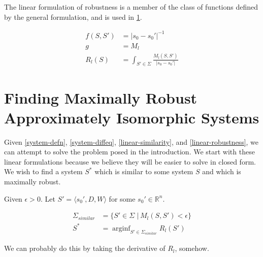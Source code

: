 \documentclass{article}
\DeclareMathOperator*{\arginf}{arginf}
\begin{document}
The linear formulation of robustness is a member of the class of functions defined by the general formulation, and is used in \ref{max-robust}.

\begin{align}
  f(S, S') &= \lvert s_0 - s_0' \rvert^{-1} \\
  g &= M_l \\
  R_l(S) &= \int_{S' \in \Sigma} \frac{M_l(S, S')}{\lvert s_0 - s_0' \rvert} \label{linear-robustness}
\end{align}

\section{Finding Maximally Robust Approximately Isomorphic Systems} \label{max-robust}
Given \eqref{system-defn}, \eqref{system-diffeq}, \eqref{linear-similarity}, and \eqref{linear-robustness}, we can attempt to solve the problem posed in the introduction. We start with these linear formulations because we believe they will be easier to solve in closed form. We wish to find a system $S^*$ which is similar to some system $S$ and which is maximally robust.

Given $\epsilon > 0$. Let $S' = \langle s_0', D, W \rangle$ for some $s_0' \in \mathbb{R}^n$.

\begin{align}
  \Sigma_{similar} &= \{S' \in \Sigma \,\,|\, M_l(S, S') < \epsilon \} \\
  S^* &= \arginf_{S' \in \Sigma_{similar}} R_l(S')
\end{align}

We can probably do this by taking the derivative of $R_l$, somehow.
\end{document}
